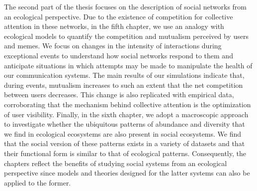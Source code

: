 The second part of the thesis focuses on the description of social networks from an ecological perspective. Due to the existence of competition for collective attention in these networks, in the fifth chapter, we use an analogy with ecological models to quantify the competition and mutualism perceived by users and memes. We focus on changes in the intensity of interactions during exceptional events to understand how social networks respond to them and anticipate situations in which attempts may be made to manipulate the health of our communication systems. The main results of our simulations indicate that, during events, mutualism increases to such an extent that the net competition between users decreases. This change is also replicated with empirical data, corroborating that the mechanism behind collective attention is the optimization of user visibility. Finally, in the sixth chapter, we adopt a macroscopic approach to investigate whether the ubiquitous patterns of abundance and diversity that we find in ecological ecosystems are also present in social ecosystems. We find that the social version of these patterns exists in a variety of datasets and that their functional form is similar to that of ecological patterns. Consequently, the chapters reflect the benefits of studying social systems from an ecological perspective since models and theories designed for the latter systems can also be applied to the former.







